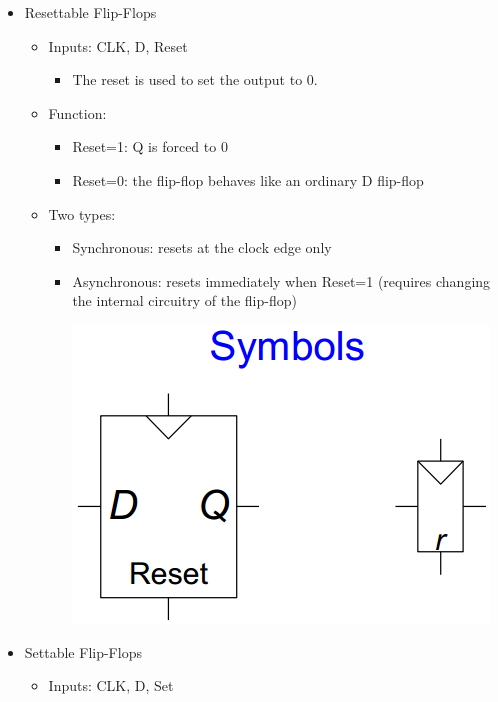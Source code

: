 \documentclass[a4paper]{article}
\begin{document}
\begin{itemize}
\begin{itemize}
\begin{itemize}
\begin{center}
						\end{center}
					\end{itemize}
			\end{itemize}
		\item Resettable Flip-Flops
			\begin{itemize}
				\item Inputs: CLK, D, Reset
					\begin{itemize}
						\item The reset is used to set the output to 0.
					\end{itemize}
				\item Function:
					\begin{itemize}
						\item Reset=1: Q is forced to 0
						\item Reset=0: the flip-flop behaves like an ordinary D flip-flop
					\end{itemize}
				\item Two types:
					\begin{itemize}
						\item Synchronous: resets at the clock edge only
						\item Asynchronous: resets immediately when Reset=1 (requires changing the internal circuitry of the flip-flop)\\
						\begin{center}
							\includegraphics[scale=1]{Figures/ResettableFLip-Flops.jpg}
						\end{center}
					\end{itemize}
			\end{itemize}
		\item Settable Flip-Flops
			\begin{itemize}
				\item Inputs: CLK, D, Set

\end{itemize}
\end{itemize}
\end{document}
